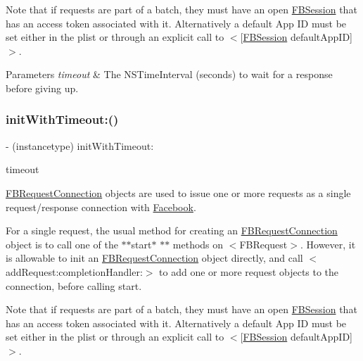 Note that if requests are part of a batch, they must have an open \hyperlink{interfaceFBSession}{F\+B\+Session} that has an access token associated with it. Alternatively a default App ID must be set either in the plist or through an explicit call to $<$\mbox{[}\hyperlink{interfaceFBSession}{F\+B\+Session} default\+App\+ID\mbox{]}$>$.


\begin{DoxyParams}{Parameters}
{\em timeout} & The {\ttfamily N\+S\+Time\+Interval} (seconds) to wait for a response before giving up. \\
\hline
\end{DoxyParams}
\mbox{\label{interfaceFBRequestConnection_a00435ea153b22e8613108afdbabcadff}} 
\subsubsection{\texorpdfstring{init\+With\+Timeout\+:()}{initWithTimeout:()}\hspace{0.1cm}{\footnotesize\ttfamily [5/5]}}
{\footnotesize\ttfamily -\/ (instancetype) init\+With\+Timeout\+: \begin{DoxyParamCaption}\item[{(N\+S\+Time\+Interval)}]{timeout }\end{DoxyParamCaption}}

{\ttfamily \hyperlink{interfaceFBRequestConnection}{F\+B\+Request\+Connection}} objects are used to issue one or more requests as a single request/response connection with \hyperlink{interfaceFacebook}{Facebook}.

For a single request, the usual method for creating an {\ttfamily \hyperlink{interfaceFBRequestConnection}{F\+B\+Request\+Connection}} object is to call one of the $\ast$$\ast$start$\ast$ $\ast$$\ast$ methods on $<$\+F\+B\+Request$>$. However, it is allowable to init an {\ttfamily \hyperlink{interfaceFBRequestConnection}{F\+B\+Request\+Connection}} object directly, and call $<$add\+Request\+:completion\+Handler\+:$>$ to add one or more request objects to the connection, before calling start.

Note that if requests are part of a batch, they must have an open \hyperlink{interfaceFBSession}{F\+B\+Session} that has an access token associated with it. Alternatively a default App ID must be set either in the plist or through an explicit call to $<$\mbox{[}\hyperlink{interfaceFBSession}{F\+B\+Session} default\+App\+ID\mbox{]}$>$.


